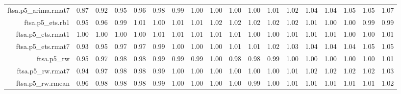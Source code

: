 \begin{tabular}{rrrrrrrrrrrrrrrrrr}
  ftsa.p5\_arima.rmat7 & 0.87 & 0.92 & 0.95 & 0.96 & 0.98 & 0.99 & 1.00 & 1.00 & 1.00 & 1.00 & 1.01 & 1.02 & 1.04 & 1.04 & 1.05 & 1.05 & 1.07 \\ 
  ftsa.p5\_ets.rb1 & 0.95 & 0.96 & 0.99 & 1.01 & 1.00 & 1.01 & 1.01 & 1.02 & 1.02 & 1.02 & 1.02 & 1.02 & 1.01 & 1.00 & 1.00 & 0.99 & 0.99 \\ 
  ftsa.p5\_ets.rmat1 & 1.00 & 1.00 & 1.00 & 1.00 & 1.01 & 1.01 & 1.01 & 1.01 & 1.01 & 1.00 & 1.00 & 1.01 & 1.01 & 1.01 & 1.00 & 1.00 & 1.01 \\ 
  ftsa.p5\_ets.rmat7 & 0.93 & 0.95 & 0.97 & 0.97 & 0.99 & 1.00 & 1.00 & 1.00 & 1.01 & 1.01 & 1.02 & 1.03 & 1.04 & 1.04 & 1.04 & 1.05 & 1.05 \\ 
  ftsa.p5\_rw & 0.95 & 0.97 & 0.98 & 0.98 & 0.99 & 0.99 & 0.99 & 1.00 & 0.98 & 0.98 & 0.99 & 1.00 & 1.00 & 1.00 & 1.00 & 1.00 & 1.01 \\ 
  ftsa.p5\_rw.rmat7 & 0.94 & 0.97 & 0.98 & 0.98 & 0.99 & 1.00 & 1.00 & 1.00 & 1.00 & 1.00 & 1.00 & 1.01 & 1.02 & 1.02 & 1.02 & 1.02 & 1.03 \\ 
  ftsa.p5\_rw.rmean & 0.96 & 0.98 & 0.98 & 0.98 & 0.99 & 1.00 & 1.00 & 1.00 & 1.00 & 0.99 & 1.00 & 1.01 & 1.01 & 1.01 & 1.01 & 1.01 & 1.02 \\ 
   \hline
\end{tabular}
